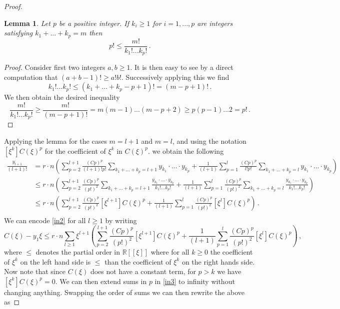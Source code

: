 \documentclass[10pt,a4paper]{amsart}
\newtheorem{lemma}{Lemma}
\begin{document}
\begin{proof}
\begin{lemma}Let $p$ be a positive integer. If $k_i\geq 1$ for $i=1,...,p$ are integers satisfying $k_1+...+k_p=m$ then
\begin{equation*}
    p!\leq \frac{m!}{k_1!...k_p!}\,.
\end{equation*}
\end{lemma}
\begin{proof}
Consider first two integers $a,b\geq 1$. It is then easy to see by a direct computation that $(a+b-1)!\geq a!b!$. Successively applying this we find
\begin{equation*}
k_1!...k_p!\leq (k_1+...+k_p-p+1)!=(m-p+1)!\,.
\end{equation*}
We then obtain the desired inequality
\begin{equation*}
\frac{m!}{k_1!...k_p!}\geq \frac{m!}{(m-p+1)!}=m(m-1)...(m-p+2)\geq p(p-1)...2=p!\,.
\end{equation*}
\end{proof}
Applying the lemma for the cases $m=l+1$ and $m=l$, and using the notation $[\xi^k]C(\xi)^p$ for the coefficient of $\xi^k$ in $C(\xi)^p$. we obtain the following 
\begin{equation}\label{in2}
\begin{split}
    \frac{y_{l+1}}{(l+1)!}&=r\cdot n\left(\sum_{p=2}^{l+1}\frac{(Cp)^p}{(l+1)!p!}\sum_{k_1+...+k_p=l+1}y_{k_1}\cdot...\cdot y_{k_p}+\frac{1}{(l+1)}\sum_{p=1}^{l}\frac{(Cp)^p}{l!p!}\sum_{k_1+...+k_p=l}y_{k_1}\cdot...\cdot y_{k_p}\right)\\
    &\leq r\cdot n\left(\sum_{p=2}^{l+1}\frac{(Cp)^p}{(p!)^2}\sum_{k_1+...+k_p=l+1}\frac{y_{k_1}\cdot...\cdot y_{k_p}}{k_1!...k_p!}+\frac{1}{(l+1)}\sum_{p=1}^{l}\frac{(Cp)^p}{(p!)^2}\sum_{k_1+...+k_p=l}\frac{y_{k_1}\cdot...\cdot y_{k_p}}{k_1!...k_p!}\right)\\
    &\leq r\cdot n\left(\sum_{p=2}^{l+1}\frac{(Cp)^p}{(p!)^2}[\xi^{l+1}]C(\xi)^p+\frac{1}{(l+1)}\sum_{p=1}^{l}\frac{(Cp)^p}{(p!)^2}[\xi^l]C(\xi)^p\right)\,.\\
\end{split}
\end{equation}
We can encode \eqref{in2} for all $l\geq 1$ by writing 
\begin{equation}\label{in3}
    C(\xi)-y_1\xi \leq r\cdot n\sum_{l\geq 1}\xi^{l+1}\left(\sum_{p=2}^{l+1}\frac{(Cp)^p}{(p!)^2}[\xi^{l+1}]C(\xi)^p+\frac{1}{(l+1)}\sum_{p=1}^{l}\frac{(Cp)^p}{(p!)^2}[\xi^l]C(\xi)^p\right)\,,
\end{equation}
where $\leq$ denotes the partial order in  $\mathbb{R}[[\xi]]$ where for all  $k\geq 0$ the coefficient of $\xi^k$ on the left hand side is $\leq$ than the coefficient of $\xi^k$ on the right hands side. Now note that since $C(\xi)$ does not have a constant term, for $p>k$ we have $[\xi^k]C(\xi)^p=0$. We can then extend sums in $p$ in \eqref{in3} to infinity without changing anything.  
Swapping the order of sums we can then rewrite the above as 


\end{proof}
\end{document}
